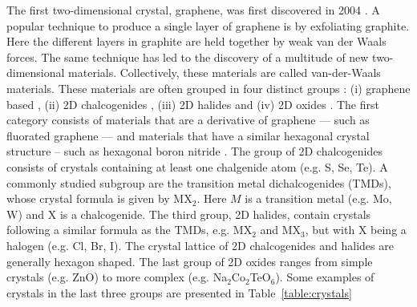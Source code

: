 The first two-dimensional crystal, graphene, was first discovered in 2004 \cite{novoselov_electric_2004}. A popular technique to produce a single layer of graphene is by exfoliating graphite. Here the different layers in graphite are held together by weak van der Waals forces. The same technique has led to the discovery of a multitude of new two-dimensional materials. Collectively, these materials are called van-der-Waals materials. These materials are often grouped in four distinct groups \cite{sethulakshmi_magnetism_2019,tsymbal_spintronics_2019, liu_chapter_2020}: (i) graphene based \cite{?}, (ii) 2D chalcogenides \cite{novoselov_two-dimensional_2005, yang_long-lived_2015, chhowalla_chemistry_2013, wang_electronics_2012-1, ugeda_characterization_2016, zhang_direct_2013, ma_evidence_2012, butler_progress_2013, zeng_valley_2012, xiao_coupled_2012, mak_atomically_2010, radisavljevic_single-layer_2011}, (iii) 2D halides \cite{?} and (iv) 2D oxides \cite{?}. The first category consists of materials that are a derivative of graphene --- such as fluorated graphene \cite{feng_two-dimensional_2016} --- and materials that have a similar hexagonal crystal structure -- such as hexagonal boron nitride \cite{zhang_two_2017}. The group of 2D chalcogenides consists of crystals containing at least one chalgenide atom (e.g. S, Se, Te). A commonly studied subgroup are the transition metal dichalcogenides (TMDs), whose crystal formula is given by MX$_2$. Here $M$ is a transition metal (e.g. Mo, W) and X is a chalcogenide. The third group, 2D halides, contain crystals following a similar formula as the TMDs, e.g. MX$_2$ and MX$_3$, but with X being a halogen (e.g. Cl, Br, I). The crystal lattice of 2D chalcogenides and halides are generally hexagon shaped. The last group of 2D oxides ranges from simple crystals (e.g. ZnO) to more complex (e.g. Na$_2$Co$_2$TeO$_6$). Some examples of crystals in the last three groups are presented in Table~\ref{table:crystals}
